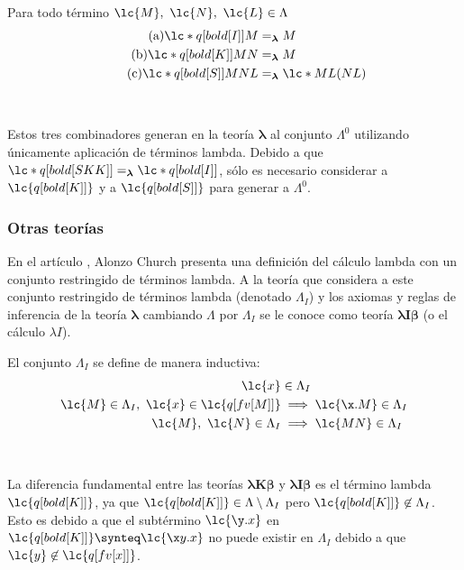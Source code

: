 \begin{cor} Para todo término \(\lc{M},\ \lc{N},\ \lc{L} \in \Lambda\)
  \begin{align}
    \tag{a}
    \lc*{q[bold[I]] M} &=_{\boldsymbol{\lambda}} M \\
    \tag{b}
    \lc*{q[bold[K]] M N} &=_{\boldsymbol{\lambda}} M \\
    \tag{c}
    \lc*{q[bold[S]] M N L} &=_{\boldsymbol{\lambda}} \lc*{M L(N L)}
  \end{align}
\end{cor} \

Estos tres combinadores generan en la teoría \(\boldsymbol{\lambda}\) al
conjunto \(\Lambda^{0}\) utilizando únicamente aplicación de términos lambda.
Debido a que \(\lc*{q[bold[S K K]]}=_{\boldsymbol{\lambda}} \lc*{q[bold[I]]}\),
sólo es necesario considerar a \(\lc{q[bold[K]]}\) y a \(\lc{q[bold[S]]}\) para
generar a \(\Lambda^{0}\). \\

\subsubsection{Otras teorías}

En el artículo \cite{Church:LambdaConversion}, Alonzo Church presenta una
definición del cálculo lambda con un conjunto restringido de términos lambda. A
la teoría que considera a este conjunto restringido de términos lambda (denotado
\(\Lambda_{I}\)) y los axiomas  y reglas de inferencia de la teoría
\(\boldsymbol{\lambda}\) cambiando \(\Lambda\) por \(\Lambda_{I}\) se le conoce
como teoría \(\boldsymbol{\lambda I \beta}\) (o el cálculo \(\lambda I\)). \\

\begin{defi} El conjunto \(\Lambda_{I}\) se define de manera inductiva:
  \label{definicion:lambdaI}
  \begin{align*}
    \lc{x} &\in \Lambda_{I} \\
    \lc{M}\in \Lambda_{I},\ \lc{x} \in \lc{q[fv[M]]} &\implies \lc{\x.M} \in
  \Lambda_{I} \\
    \lc{M},\ \lc{N} \in \Lambda_{I} &\implies \lc{M N} \in \Lambda_{I}
  \end{align*}
\end{defi} \

La diferencia fundamental entre las teorías \(\boldsymbol{\lambda K \beta}\) y
\(\boldsymbol{\lambda I \beta}\) es el término lambda \(\lc{q[bold[K]]}\), ya que
\(\lc{q[bold[K]]} \in \Lambda \setminus \Lambda_{I}\) pero \(\lc{q[bold[K]]}
\not\in \Lambda_{I}\). Esto es debido a que el subtérmino \(\lc{\y.x}\) en
\(\lc{q[bold[K]]}\synteq \lc{\x y.x}\) no puede existir en \(\Lambda_{I}\)
debido a que \(\lc{y} \not\in \lc{q[fv[x]]}\). \\




